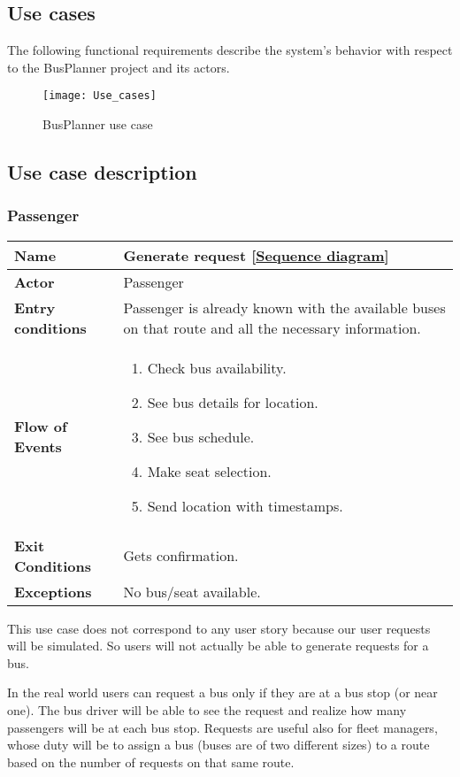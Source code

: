 \subsection{Use cases}
The following functional requirements describe the system’s behavior with respect to the BusPlanner project and its actors.
\begin{figure}[H]
	\centering
	\texttt{[image: Use\_cases]}
	\caption{BusPlanner use case}
\end{figure}
\subsection{Use case description}
\subsubsection{Passenger}
\begin{table}[H]
	\centering
	\begin{tabular}{| m{3.5cm} | m{9.5cm} |}
		\hline
		\textbf{Name} & Generate request [\hyperlink{Generate_request}{Sequence diagram}]\\
		\hline
		\textbf{Actor} & Passenger\\
		\hline
		\textbf{Entry conditions} & Passenger is already known with the available buses on that route and all the necessary information.\\
		\hline
		\textbf{Flow of Events} & 
		\begin{enumerate}
			\item Check bus availability.
			\item See bus details for location.
			\item See bus schedule. 
			\item Make seat selection.
			\item Send location with timestamps.
		\end{enumerate}\\
		\hline
		\textbf{Exit Conditions} & Gets confirmation.\\
		\hline
		\textbf{Exceptions} & No bus/seat available.\\
		\hline
	\end{tabular}
\end{table}
This use case does not correspond to any user story because our user requests will be simulated. So users will not actually be able to generate requests for a bus.

In the real world users can request a bus only if they are at a bus stop (or near one). The bus driver will be able to see the request and realize how many passengers will be at each bus stop. Requests are useful also for fleet managers, whose duty will be to assign a bus (buses are of two different sizes) to a route based on the number of requests on that same route. 

